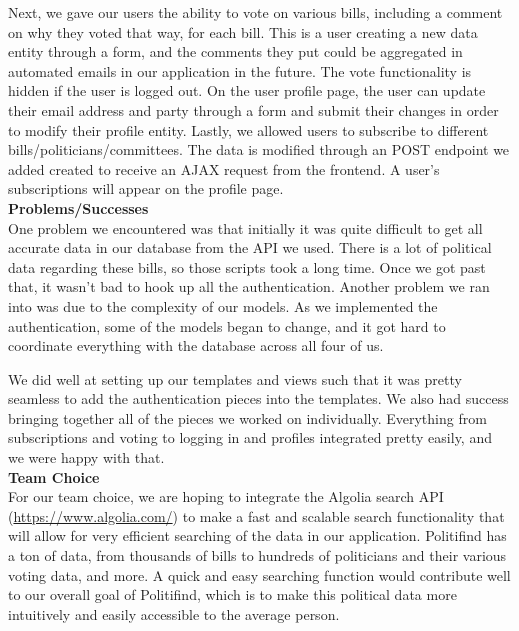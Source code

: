 \documentclass{article}
\newcommand{\n}{\noindent}
\begin{document}
Next, we gave our users the ability to vote on various bills, including a comment on why they voted that way, for each bill. This is a user creating a new data entity through a form, and the comments they put could be aggregated in automated emails in our application in the future.  The vote functionality is hidden if the user is logged out. On the user profile page, the user can update their email address and party through a form and submit their changes in order to modify their profile entity.  Lastly, we allowed users to subscribe to different bills/politicians/committees. The data is modified through an POST endpoint we added created to receive an AJAX request from the frontend.   A user's subscriptions will appear on the profile page.\\

\n\textbf{Problems/Successes} \\

One problem we encountered was that initially it was quite difficult to get all accurate data in our database from the API we used. There is a lot of political data regarding these bills, so those scripts took a long time. Once we got past that, it wasn't bad to hook up all the authentication. Another problem we ran into was due to the complexity of our models. As we implemented the authentication, some of the models began to change, and it got hard to coordinate everything with the database across all four of us.

We did well at setting up our templates and views such that it was pretty seamless to add the authentication pieces into the templates. We also had success bringing together all of the pieces we worked on individually. Everything from subscriptions and voting to logging in and profiles integrated pretty easily, and we were happy with that.\\

\n\textbf{Team Choice} \\

For our team choice, we are hoping to integrate the Algolia search API (\url{https://www.algolia.com/}) to make a fast and scalable search functionality that will allow for very efficient searching of the data in our application. Politifind has a ton of data, from thousands of bills to hundreds of politicians and their various voting data, and more. A quick and easy searching function would contribute well to our overall goal of Politifind, which is to make this political data more intuitively and easily accessible to the average person.
\end{document}
